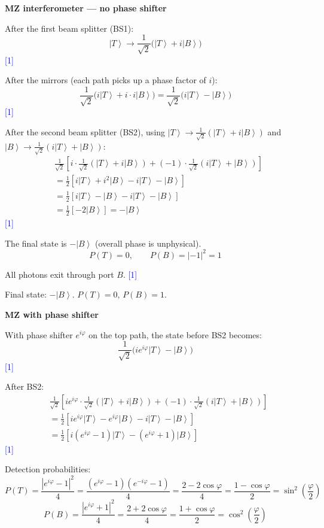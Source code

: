 \documentclass[12pt,a4paper]{article}
\newcommand{\markstep}[1]{\hfill\textcolor{blue}{[#1]}}
\newcommand{\finalanswer}[1]{%
  \begin{tcolorbox}[colback=green!5!white,colframe=green!50!black,boxrule=0.5pt]
  #1
  \end{tcolorbox}
}
\renewcommand{\ket}[1]{\left|#1\right\rangle}
\begin{document}
\begin{parts}
\item \textbf{MZ interferometer --- no phase shifter} 

After the first beam splitter (BS1):
\[
\ket{T} \to \frac{1}{\sqrt{2}}\bigl(\ket{T} + i\ket{B}\bigr)
\]
\markstep{1}

After the mirrors (each path picks up a phase factor of $i$):
\[
\frac{1}{\sqrt{2}}\bigl(i\ket{T} + i \cdot i\ket{B}\bigr) = \frac{1}{\sqrt{2}}\bigl(i\ket{T} - \ket{B}\bigr)
\]
\markstep{1}

After the second beam splitter (BS2), using $\ket{T} \to \frac{1}{\sqrt{2}}(\ket{T} + i\ket{B})$ and $\ket{B} \to \frac{1}{\sqrt{2}}(i\ket{T} + \ket{B})$:
\begin{align*}
&\frac{1}{\sqrt{2}}\left[i \cdot \frac{1}{\sqrt{2}}(\ket{T} + i\ket{B}) + (-1) \cdot \frac{1}{\sqrt{2}}(i\ket{T} + \ket{B})\right] \\
&= \frac{1}{2}\left[i\ket{T} + i^2\ket{B} - i\ket{T} - \ket{B}\right] \\
&= \frac{1}{2}\left[i\ket{T} - \ket{B} - i\ket{T} - \ket{B}\right] \\
&= \frac{1}{2}\left[-2\ket{B}\right] = -\ket{B}
\end{align*}
\markstep{1}

The final state is $-\ket{B}$ (overall phase is unphysical).
\[
P(T) = 0, \qquad P(B) = |-1|^2 = 1
\]

All photons exit through port $B$. \markstep{1}

\finalanswer{Final state: $-\ket{B}$. \quad $P(T) = 0$, $P(B) = 1$.}

\item \textbf{MZ with phase shifter} 

With phase shifter $e^{i\varphi}$ on the top path, the state before BS2 becomes:
\[
\frac{1}{\sqrt{2}}\bigl(ie^{i\varphi}\ket{T} - \ket{B}\bigr)
\]
\markstep{1}

After BS2:
\begin{align*}
&\frac{1}{\sqrt{2}}\left[ie^{i\varphi} \cdot \frac{1}{\sqrt{2}}(\ket{T} + i\ket{B}) + (-1)\cdot\frac{1}{\sqrt{2}}(i\ket{T} + \ket{B})\right] \\
&= \frac{1}{2}\left[ie^{i\varphi}\ket{T} - e^{i\varphi}\ket{B} - i\ket{T} - \ket{B}\right] \\
&= \frac{1}{2}\left[i(e^{i\varphi} - 1)\ket{T} - (e^{i\varphi} + 1)\ket{B}\right]
\end{align*}
\markstep{1}

Detection probabilities:
\[
P(T) = \frac{|e^{i\varphi} - 1|^2}{4} = \frac{(e^{i\varphi} - 1)(e^{-i\varphi} - 1)}{4} = \frac{2 - 2\cos\varphi}{4} = \frac{1 - \cos\varphi}{2} = \sin^2\!\left(\frac{\varphi}{2}\right)
\]
\[
P(B) = \frac{|e^{i\varphi} + 1|^2}{4} = \frac{2 + 2\cos\varphi}{4} = \frac{1 + \cos\varphi}{2} = \cos^2\!\left(\frac{\varphi}{2}\right)
\]


\end{parts}
\end{document}
